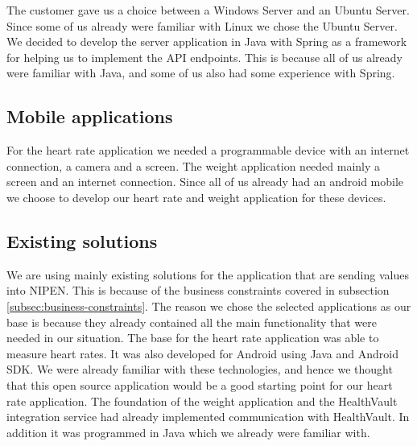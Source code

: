 The customer gave us a choice between a Windows Server and an Ubuntu Server.
Since some of us already were familiar with Linux we chose the Ubuntu Server.
We decided to develop the server application in Java with Spring as a framework for helping us to implement the API endpoints.
This is because all of us already were familiar with Java, and some of us also had some experience with Spring.

\subsection{Mobile applications}

For the heart rate application we needed a programmable device with an internet connection, a camera and a screen.
The weight application needed mainly a screen and an internet connection.
Since all of us already had an android mobile we choose to develop our heart rate and weight application for these devices.

\subsection{Existing solutions}

We are using mainly existing solutions for the application that are sending values into NIPEN.
This is because of the business constraints covered in subsection \ref{subsec:business-constraints}.
The reason we chose the selected applications as our base is because they already contained all the main functionality that were needed in our situation.
The base for the heart rate application was able to measure heart rates.
It was also developed for Android using Java and Android SDK.
We were already familiar with these technologies, and hence we thought that this open source application would be a good starting point for our heart rate application.
The foundation of the weight application and the HealthVault integration service had already implemented communication with HealthVault.
In addition it was programmed in Java which we already were familiar with.